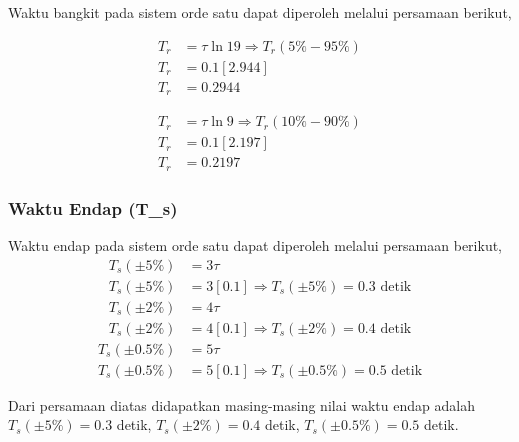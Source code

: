 \documentclass[../laporan]{subfiles}
\begin{document}
Waktu bangkit pada sistem orde satu dapat diperoleh melalui persamaan berikut,

\begin{equation}
    \begin{split}
        T_r &= \tau\ln{19} \Rightarrow T_r(5\% - 95\%) \\[5pt]
        T_r &= 0.1[2.944] \\[5pt]
        T_r &= 0.2944
    \end{split}
\end{equation}

\begin{equation}
    \begin{split}
        T_r &= \tau\ln{9} \Rightarrow T_r(10\% - 90\%) \\[5pt]
        T_r &= 0.1[2.197] \\[5pt]
        T_r &= 0.2197
    \end{split}
\end{equation}

\subsubsection{Waktu Endap (T_s)}

Waktu endap pada sistem orde satu dapat diperoleh melalui persamaan berikut,
\begin{equation}
    \begin{split}
        T_s(\pm5\%) &= 3\tau \\[5pt]
        T_s(\pm5\%) &= 3[0.1] \Rightarrow T_s(\pm5\%) = 0.3 \text{ detik}
    \end{split}
\end{equation}
\begin{equation}
    \begin{split}
        T_s(\pm2\%) &= 4\tau \\[5pt]
        T_s(\pm2\%) &= 4[0.1] \Rightarrow T_s(\pm2\%) = 0.4 \text{ detik}
    \end{split}
\end{equation}
\begin{equation}
    \begin{split}
        T_s(\pm0.5\%) &= 5\tau \\[5pt]
        T_s(\pm0.5\%) &= 5[0.1] \Rightarrow T_s(\pm0.5\%) = 0.5 \text{ detik}
    \end{split}
\end{equation}

Dari persamaan diatas didapatkan masing-masing nilai waktu endap adalah $T_s(\pm5\%) = 0.3$ detik, $T_s(\pm2\%) = 0.4$ detik, $T_s(\pm0.5\%) = 0.5$ detik.
\end{document}
